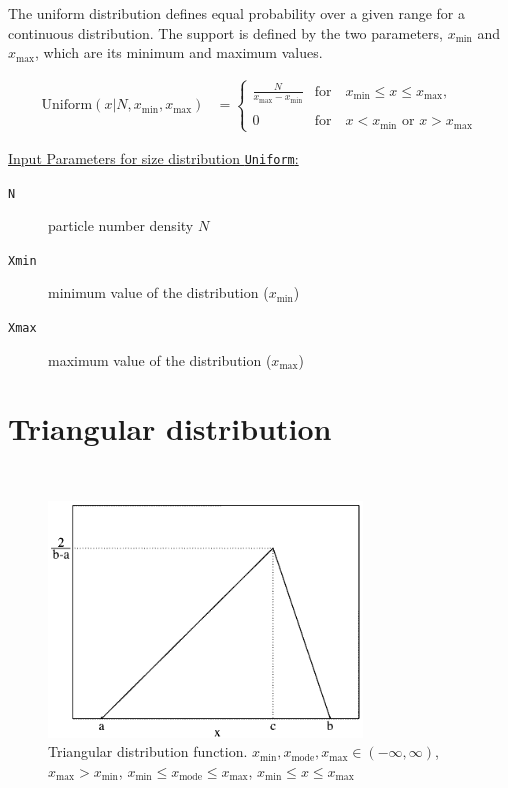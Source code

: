 The uniform distribution defines equal probability over a given range for a continuous distribution.
The support is defined by the two parameters, $x_\text{min}$ and $x_\text{max}$, which are its
minimum and maximum values.

\begin{subequations}
\begin{align}
\text{Uniform}(x\vert N, x_\text{min},x_\text{max}) & =
   \begin{cases}
      \displaystyle \frac{N}{x_\text{max}-x_\text{min}} & \text{for} \quad x_\text{min}\leq x\leq x_\text{max}, \\
      & \\
      \displaystyle 0               & \text{for} \quad x< x_\text{min} \text{~or~} x>x_\text{max}
   \end{cases}
\end{align}
\end{subequations}

\vspace{5mm}
\underline{Input Parameters for size distribution \texttt{Uniform}:}
\begin{description}
\item[\texttt{N}] particle number density $N$
\item[\texttt{Xmin}] minimum value of the distribution ($x_\text{min}$)
\item[\texttt{Xmax}] maximum value of the distribution ($x_\text{max}$)
\end{description}


\clearpage
\section{Triangular distribution} ~\\

\begin{figure}[htb]
\begin{center}
\includegraphics[width=0.744\textwidth,height=0.558\textwidth]{Triangular.png}
\end{center}
\caption{Triangular distribution function.
$x_\text{min},x_\text{mode},x_\text{max} \in (-\infty,\infty)$,
$x_\text{max}>x_\text{min}$,
$x_\text{min}\leq x_\text{mode}\leq x_\text{max}$,
$x_\text{min}\leq x \leq x_\text{max}$}
\label{Triangular}
\end{figure}

